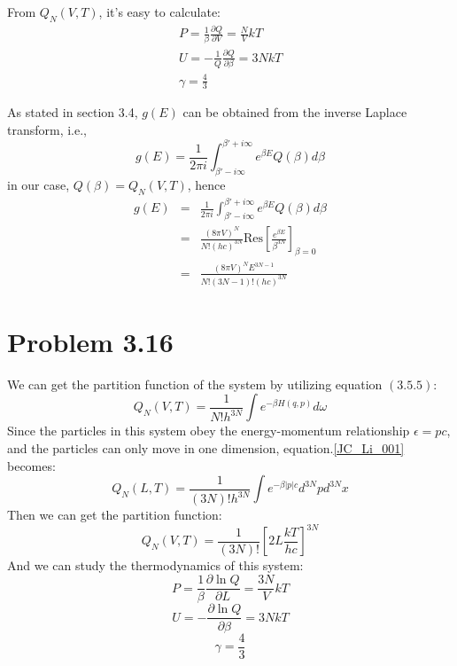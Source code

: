 \documentclass{article}
\begin{document}
	From $Q_N(V,T)$, it's easy to calculate:
	\begin{gather*}
		P=\frac{1}{\beta} \frac{\partial Q}{\partial V} = \frac{N}{V}kT\\
		U = -\frac{1}{Q} \frac{\partial Q}{\partial \beta}=3NkT\\
		\gamma = \frac{4}{3}
	\end{gather*}


	As stated in section 3.4, $g(E) $ can be obtained from the inverse Laplace transform, i.e.,
	\begin{equation*}
		g(E)=\frac{1}{2 \pi i}\int_{\beta'-i\infty}^{\beta'+i\infty} e^{\beta E} Q(\beta)d \beta
	\end{equation*}
	in our case, $Q(\beta)=Q_N(V, T) $, hence
	\begin{eqnarray*}
		g(E) &=& \frac{1}{2 \pi i}\int_{\beta'-i\infty}^{\beta'+i\infty} e^{\beta E} Q(\beta)d \beta\\
		&=& \frac{(8 \pi  V)^N}{N!(hc)^{3N} } \text{Res}\left[ \frac{e^{\beta E}}{\beta^{3N}} \right]_{\beta=0}\\
		&=& \frac{(8 \pi  V)^N E^{3N-1}}{N!(3N-1)!(hc)^{3N} }
	\end{eqnarray*}



\section*{Problem 3.16}

    We can get the partition function of the system by utilizing equation $(3.5.5)$:
    \begin{equation}
        Q_N(V,T)=\frac{1}{N! h^{3N}}\int e^{-\beta H(q,p)}d\omega
        \label{JC_Li_001}
    \end{equation}
    Since the particles in this system obey the energy-momentum relationship $\epsilon=pc$, and the particles can only move in one dimension,  equation.\eqref{JC_Li_001} becomes:
    \begin{equation}
        Q_N(L,T)=\frac{1}{(3N)! h^{3N}}\int e^{-\beta |p|c}d^{3N}p d^{3N}x
    \end{equation}
    Then we can get the partition function:
    \begin{equation}
        Q_N(V,T)=\frac{1}{(3N)!}\left[2L\frac{kT}{hc}\right]^{3N}
        \label{JC_Li_002}
    \end{equation}
    And we can study the thermodynamics of this system:
    $$
        P=\frac{1}{\beta} \frac{\partial \ln Q}{\partial L} = \frac{3 N}{V}kT
    $$
    $$
        U = - \frac{\partial \ln Q}{\partial \beta}=3NkT
    $$
    $$
        \gamma = \frac{4}{3}
    $$
\end{document}
